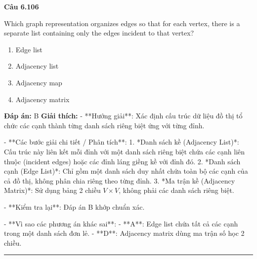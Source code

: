\documentclass[11pt,a4paper]{article}
\newenvironment{question}[1]{%
  \par\vspace{1em}\noindent\textbf{\large Câu #1}\par\vspace{0.4em}
}{%
  \par\vspace{1em}\hrule\vspace{0.6em}
}
\newenvironment{choices}{%
  \begin{enumerate}[label=\textbf{\Alph*.},leftmargin=2.2em,itemsep=2pt,topsep=3pt]
}{%
  \end{enumerate}
}
\newcommand{\choice}{\item}
\begin{document}
\begin{question}{6.106}
Which graph representation organizes edges so that for each vertex, there is a separate list containing only the edges incident to that vertex?
\begin{choices}
\choice Edge list
\choice Adjacency list
\choice Adjacency map
\choice Adjacency matrix
\end{choices}
\textbf{Đáp án:} B
\textbf{Giải thích:} - **Hướng giải**:
  Xác định cấu trúc dữ liệu đồ thị tổ chức các cạnh thành từng danh sách riêng biệt ứng với từng đỉnh.

- **Các bước giải chi tiết / Phân tích**:
  1. *Danh sách kề (Adjacency List)*: Cấu trúc này liên kết mỗi đỉnh với một danh sách riêng biệt chứa các cạnh liên thuộc (incident edges) hoặc các đỉnh láng giềng kề với đỉnh đó.
  2. *Danh sách cạnh (Edge List)*: Chỉ gồm một danh sách duy nhất chứa toàn bộ các cạnh của cả đồ thị, không phân chia riêng theo từng đỉnh.
  3. *Ma trận kề (Adjacency Matrix)*: Sử dụng bảng 2 chiều \(V \times V\), không phải các danh sách riêng biệt.

- **Kiểm tra lại**:
  Đáp án B khớp chuẩn xác.

- **Vì sao các phương án khác sai**:
  - **A**: Edge list chứa tất cả các cạnh trong một danh sách đơn lẻ.
  - **D**: Adjacency matrix dùng ma trận số học 2 chiều.
\end{question}
\end{document}
